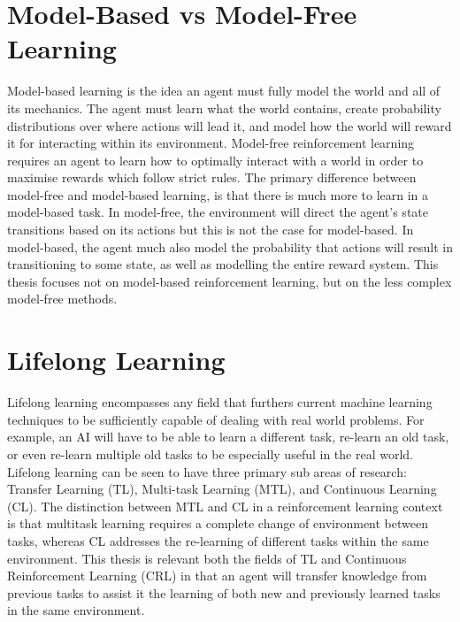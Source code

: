\section{Model-Based vs Model-Free Learning}
Model-based learning is the idea an agent must fully model the world and all of its mechanics. The agent must learn what the world contains, create probability distributions over where actions will lead it, and model how the world will reward it for interacting within its environment. Model-free reinforcement learning requires an agent to learn how to optimally interact with a world in order to maximise rewards which follow strict rules. The primary difference between model-free and model-based learning, is that there is much more to learn in a model-based task. In model-free, the environment will direct the agent's state transitions based on its actions but this is not the case for model-based. In model-based, the agent much also model the probability that actions will result in transitioning to some state, as well as modelling the entire reward system. This thesis focuses not on model-based reinforcement learning, but on the less complex model-free methods. 

\section{Lifelong Learning}
Lifelong learning encompasses any field that furthers current machine learning techniques to be sufficiently capable of dealing with real world problems. For example, an AI will have to be able to learn a different task, re-learn an old task, or even re-learn multiple old tasks to be especially useful in the real world. Lifelong learning can be seen to have three primary sub areas of research: Transfer Learning (TL), Multi-task Learning (MTL), and Continuous Learning (CL). The distinction between MTL and CL in a reinforcement learning context is that multitask learning requires a complete change of environment between tasks, whereas CL addresses the re-learning of different tasks within the same environment. This thesis is relevant both the fields of TL and Continuous Reinforcement Learning (CRL) in that an agent will transfer knowledge from previous tasks to assist it the learning of both new and previously learned tasks in the same environment. 

